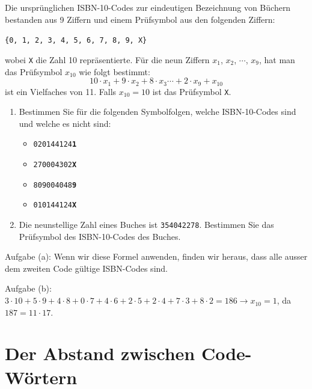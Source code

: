 \begin{myexercise}
	Die ursprünglichen \gls{ISBN}-10-Codes zur eindeutigen Bezeichnung von Büchern bestanden aus 9 Ziffern und einem Prüfsymbol aus den folgenden Ziffern:

	\texttt{\{0, 1, 2, 3, 4, 5, 6, 7, 8, 9, X\}}

	wobei \texttt{X} die Zahl 10 repräsentierte. Für die neun Ziffern \(x_1\), \(x_2\), \(\cdots\), \(x_9\), hat man das Prüfsymbol \(x_{10}\) wie folgt bestimmt:
	\[10\cdot x_1+9\cdot x_2+8\cdot x_3\cdots+2\cdot x_9 + x_{10}\]
	ist ein Vielfaches von 11. Falls \(x_{10} = 10\) ist das Prüfsymbol \texttt{X}.
	\begin{enumerate}
		\item Bestimmen Sie für die folgenden Symbolfolgen, welche \gls{ISBN}-10-Codes sind und welche es nicht sind:
		      \begin{itemize}
			      \item \texttt{020144124\textbf{1}}
			      \item \texttt{270004302\textbf{X}}
			      \item \texttt{809004048\textbf{9}}
			      \item \texttt{010144124\textbf{X}}
		      \end{itemize}
		\item Die neunstellige Zahl eines Buches ist \texttt{354042278}. Bestimmen Sie das Prüfsymbol des \gls{ISBN}-10-Codes des Buches.
	\end{enumerate}
	\begin{myanswer}


		Aufgabe (a): Wenn wir diese Formel anwenden, finden wir heraus, dass alle ausser dem zweiten Code gültige \gls{ISBN}-Codes sind.

		Aufgabe (b): \(3\cdot10+5\cdot9+4\cdot8+0\cdot7+4\cdot6+2\cdot5+2\cdot4+7\cdot3+8\cdot2=186 \rightarrow x_{10}=1\), da \(187=11\cdot17\).

	\end{myanswer}

\end{myexercise}
\clearpage
\section{Der Abstand zwischen Code-Wörtern}

